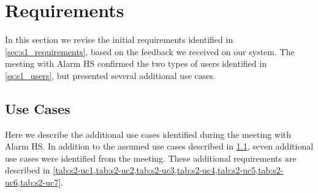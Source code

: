 \section{Requirements} \label{sec:s2_reqs}
In this section we revise the initial requirements identified in \cref{sec:s1_requirements}, based on the feedback we received on our system. The meeting with Alarm HS confirmed the two types of users identified in \cref{ss:s1_users}, but presented several additional use cases.

\subsection{Use Cases} \label{ss:s1_uc}
Here we describe the additional use cases identified during the meeting with Alarm HS. In addition to the assumed use cases described in \cref{ss:s1_uc}, seven additional use cases were identified from the meeting. These additional requirements are described in \cref{tab:s2-uc1,tab:s2-uc2,tab:s2-uc3,tab:s2-uc4,tab:s2-uc5,tab:s2-uc6,tab:s2-uc7}.

